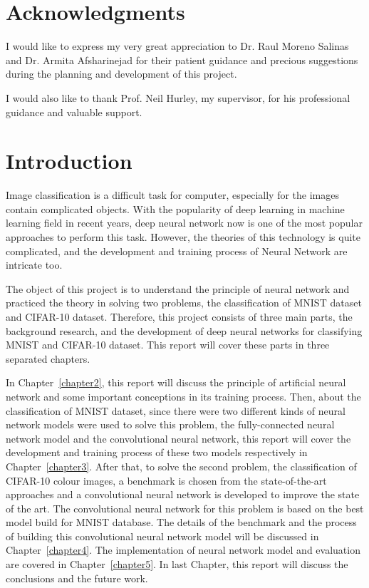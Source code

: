 \documentclass[]{UCD_CS_FYP_Report}
\begin{document}

\chapter*{Acknowledgments}

I would like to express my very great appreciation to Dr. Raul Moreno Salinas and Dr. Armita Afsharinejad for their patient guidance and precious suggestions during the planning and development of this project.

I would also like to thank Prof. Neil Hurley, my supervisor, for his professional guidance and valuable support.


\tableofcontents{}\newpage
\newpage



\chapter{Introduction}
Image classification is a difficult task for computer, especially for the images contain complicated objects. With the popularity of deep learning in machine learning field in recent years, deep neural network now is one of the most popular approaches to perform this task. However, the theories of this technology is quite complicated, and the development and training process of Neural Network are intricate too. 

The object of this project is to understand the principle of neural network and practiced the theory in solving two problems, the classification of MNIST dataset and CIFAR-10 dataset. Therefore, this project consists of three main parts, the background research, and the development of deep neural networks for classifying MNIST and CIFAR-10 dataset. This report will cover these parts in three separated chapters.

In Chapter~\ref{chapter2}, this report will discuss the principle of artificial neural network and some important conceptions in its training process. Then, about the classification of MNIST dataset, since there were two different kinds of neural network models were used to solve this problem, the fully-connected neural network model and the convolutional neural network, this report will cover the development and training process of these two models respectively in Chapter~\ref{chapter3}. After that, to solve the second problem, the classification of CIFAR-10 colour images, a benchmark is chosen from the state-of-the-art approaches and a convolutional neural network is developed to improve the state of the art. The convolutional neural network for this problem is based on the best model build for MNIST database. The details of the benchmark and the process of building this convolutional neural network model will be discussed in Chapter~\ref{chapter4}. The implementation of neural network model and evaluation are covered in Chapter~\ref{chapter5}. In last Chapter, this report will discuss the conclusions and the future work.
\end{document}
